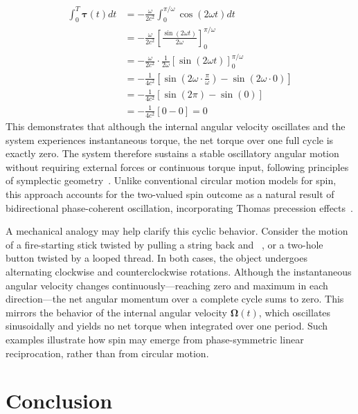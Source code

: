 \documentclass[%
 reprint,
 amsmath,amssymb,
 aps,
]{revtex4-1}
\numberwithin{equation}{section}%
\begin{document}
\begin{align}
\int_0^T \boldsymbol{\tau}(t) dt &= -\frac{\omega}{2c^2} \int_0^{\pi/\omega} \cos(2\omega t) dt \\
&= -\frac{\omega}{2c^2} \left[ \frac{\sin(2\omega t)}{2\omega} \right]_0^{\pi/\omega} \nonumber \\
&= -\frac{\omega}{2c^2} \cdot \frac{1}{2\omega} \left[ \sin(2\omega t) \right]_0^{\pi/\omega} \nonumber \\
&= -\frac{1}{4c^2} \left[ \sin\left(2\omega \cdot \frac{\pi}{\omega}\right) - \sin(2\omega \cdot 0) \right] \nonumber \\
&= -\frac{1}{4c^2} \left[ \sin(2\pi) - \sin(0) \right] \nonumber \\
&= -\frac{1}{4c^2} \left[ 0 - 0 \right] = 0 \nonumber
\label{eq:torque_integration_zero}
\end{align}
This demonstrates that although the internal angular velocity oscillates and the system experiences instantaneous torque, the net torque over one full cycle is exactly zero. The system therefore sustains a stable oscillatory angular motion without requiring external forces or continuous torque input, following principles of symplectic geometry~\cite{arnold1989}. Unlike conventional circular motion models for spin, this approach accounts for the two-valued spin outcome as a natural result of bidirectional phase-coherent oscillation, incorporating Thomas precession effects~\cite{thomas1926}.

A mechanical analogy may help clarify this cyclic behavior. Consider the motion of a fire-starting stick twisted by pulling a string back and ~\cite{goldstein2001}, or a two-hole button twisted by a looped thread. In both cases, the object undergoes alternating clockwise and counterclockwise rotations. Although the instantaneous angular velocity changes continuously—reaching zero and maximum in each direction—the net angular momentum over a complete cycle sums to zero. This mirrors the behavior of the internal angular velocity $\boldsymbol{\Omega}(t)$, which oscillates sinusoidally and yields no net torque when integrated over one period. Such examples illustrate how spin may emerge from phase-symmetric linear reciprocation, rather than from circular motion.


\section{Conclusion}
\end{document}
